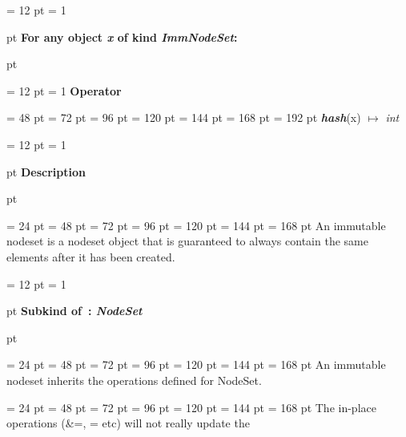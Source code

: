 {{{{{\par}
\par}
{\par \pagebreak[3.200000] \noindent \hangindent = 12 pt \hangafter = 1 
{\par \pagebreak[2]  pt \noindent
{\large {\bf For any object {\em x\/} of kind  {\em ImmNodeSet\/}:\/}}\par {} pt
} \noindent
\par}
{\par \pagebreak[3.200000] \noindent \hangindent = 12 pt \hangafter = 1 
{\bf {\large {\bf Operator\/}}\/}\par}
{\par \noindent  \leftskip = 48 pt  \leftmargini = 72 pt  \leftmarginii = 96 pt  \leftmarginiii = 120 pt  \leftmarginiv = 144 pt  \leftmarginv = 168 pt  \leftmarginvi = 192 pt  {\em {\large {\bf hash\/}}\/}(x) \(\mapsto \)  {\em int\/}\par}
\par}
\par}
{\par \pagebreak[3.300000] \noindent \hangindent = 12 pt \hangafter = 1 
{\par \pagebreak[3]  pt \noindent
{\Large {\bf Description\/}}\par {} pt
} \noindent
\par}
{\par \noindent  \leftskip = 24 pt  \leftmargini = 48 pt  \leftmarginii = 72 pt  \leftmarginiii = 96 pt  \leftmarginiv = 120 pt  \leftmarginv = 144 pt  \leftmarginvi = 168 pt  An immutable nodeset is a nodeset object that is guaranteed to always
contain the same elements after it has been created.
\par}
{\par \pagebreak[3.300000] \noindent \hangindent = 12 pt \hangafter = 1 
{\par \pagebreak[3]  pt \noindent
{\Large {\bf Subkind of~{\bf :}  {\em NodeSet\/}\/}}\par {} pt
} \noindent
\par}
{\par \noindent  \leftskip = 24 pt  \leftmargini = 48 pt  \leftmarginii = 72 pt  \leftmarginiii = 96 pt  \leftmarginiv = 120 pt  \leftmarginv = 144 pt  \leftmarginvi = 168 pt  An immutable nodeset inherits the operations defined for NodeSet.\par}
{\par \noindent  \leftskip = 24 pt  \leftmargini = 48 pt  \leftmarginii = 72 pt  \leftmarginiii = 96 pt  \leftmarginiv = 120 pt  \leftmarginv = 144 pt  \leftmarginvi = 168 pt  The in-place operations ({\&}=, {\textbar}= etc) will not really update the
}}
